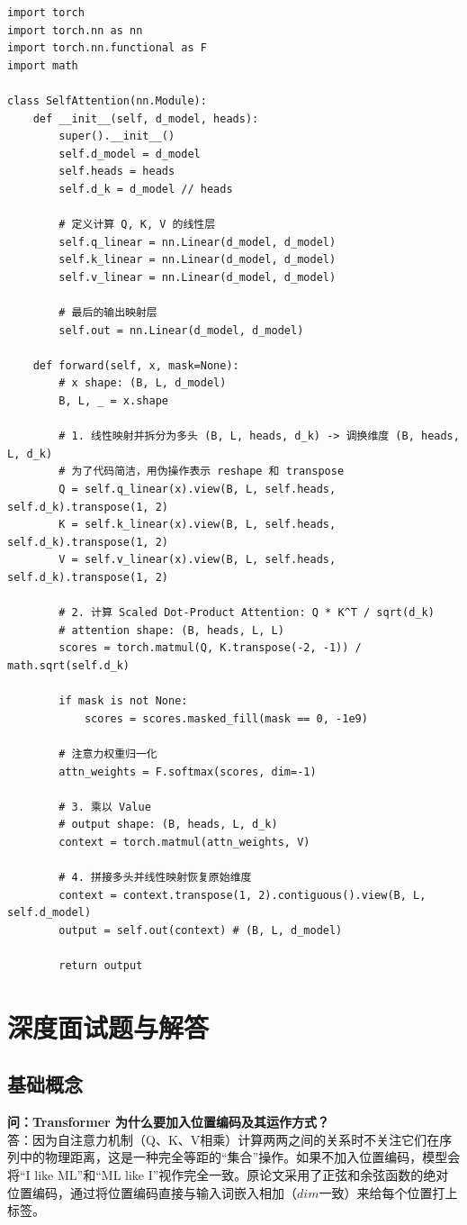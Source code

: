 \documentclass[12pt, a4paper]{book}
\begin{document}
\begin{lstlisting}
import torch
import torch.nn as nn
import torch.nn.functional as F
import math

class SelfAttention(nn.Module):
    def __init__(self, d_model, heads):
        super().__init__()
        self.d_model = d_model
        self.heads = heads
        self.d_k = d_model // heads
        
        # 定义计算 Q, K, V 的线性层
        self.q_linear = nn.Linear(d_model, d_model)
        self.k_linear = nn.Linear(d_model, d_model)
        self.v_linear = nn.Linear(d_model, d_model)
        
        # 最后的输出映射层
        self.out = nn.Linear(d_model, d_model)
        
    def forward(self, x, mask=None):
        # x shape: (B, L, d_model)
        B, L, _ = x.shape
        
        # 1. 线性映射并拆分为多头 (B, L, heads, d_k) -> 调换维度 (B, heads, L, d_k)
        # 为了代码简洁，用伪操作表示 reshape 和 transpose
        Q = self.q_linear(x).view(B, L, self.heads, self.d_k).transpose(1, 2)
        K = self.k_linear(x).view(B, L, self.heads, self.d_k).transpose(1, 2)
        V = self.v_linear(x).view(B, L, self.heads, self.d_k).transpose(1, 2)
        
        # 2. 计算 Scaled Dot-Product Attention: Q * K^T / sqrt(d_k)
        # attention shape: (B, heads, L, L)
        scores = torch.matmul(Q, K.transpose(-2, -1)) / math.sqrt(self.d_k)
        
        if mask is not None:
            scores = scores.masked_fill(mask == 0, -1e9)
            
        # 注意力权重归一化
        attn_weights = F.softmax(scores, dim=-1)
        
        # 3. 乘以 Value
        # output shape: (B, heads, L, d_k)
        context = torch.matmul(attn_weights, V)
        
        # 4. 拼接多头并线性映射恢复原始维度
        context = context.transpose(1, 2).contiguous().view(B, L, self.d_model)
        output = self.out(context) # (B, L, d_model)
        
        return output
\end{lstlisting}

\section{深度面试题与解答}
\subsection{基础概念}
\textbf{问：Transformer 为什么要加入位置编码及其运作方式？}\\
答：因为自注意力机制（Q、K、V相乘）计算两两之间的关系时不关注它们在序列中的物理距离，这是一种完全等距的“集合”操作。如果不加入位置编码，模型会将“I like ML”和“ML like I”视作完全一致。原论文采用了正弦和余弦函数的绝对位置编码，通过将位置编码直接与输入词嵌入相加（$dim$一致）来给每个位置打上标签。
\end{document}

